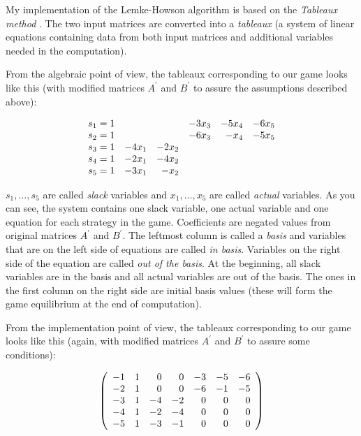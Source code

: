 \documentclass[a4paper,10pt]{article}
\begin{document}
My implementation of the Lemke-Howson algorithm is based on the \emph{Tableaux
method} \cite{Pritchard08}. The two input matrices are converted into a
\emph{tableaux} (a system of linear equations containing data from both
input matrices and additional variables needed in the computation).

From the algebraic point of view, the tableaux corresponding to our game
looks like this (with modified matrices $A^{'}$ and $B^{'}$ to assure the
assumptions described above):

$$\begin{array}{r r r r r r r r}
s_{1} = 1 &         &         & -3x_{3} & -5x_{4} & -6x_{5} \\
s_{2} = 1 &         &         & -6x_{3} & -x_{4}  & -5x_{5} \\
s_{3} = 1 & -4x_{1} & -2x_{2} &         &         &         \\
s_{4} = 1 & -2x_{1} & -4x_{2} &         &         &         \\
s_{5} = 1 & -3x_{1} & -x_{2}  &         &         &
\end{array}$$

$s_{1}, \dots, s_{5}$ are called \emph{slack} variables and $x_{1}, \dots,
x_{5}$ are called \emph{actual} variables. As you can see, the system contains
one slack variable, one actual variable and one equation for each strategy in
the game. Coefficients are negated values from original matrices $A^{'}$ and
$B^{'}$. The leftmost column is called a \emph{basis} and variables that are on
the left side of equations are called \emph{in basis}. Variables on the right
side of the equation are called \emph{out of the basis}. At the beginning, all
slack variables are in the basis and all actual variables are out of the basis.
The ones in the first column on the right side are initial basis values (these
will form the game equilibrium at the end of computation).

From the implementation point of view, the tableaux corresponding to our game
looks like this (again, with modified matrices $A^{'}$ and $B^{'}$ to assure
some conditions):

$$\left(\begin{array}{r r r r r r r}
-1 & 1 & 0 & 0 & -3 & -5 & -6 \\
-2 & 1 & 0 & 0 & -6 & -1 & -5 \\
-3 & 1 & -4 & -2 & 0 & 0 & 0 \\
-4 & 1 & -2 & -4 & 0 & 0 & 0 \\
-5 & 1 & -3 & -1 & 0 & 0 & 0
\end{array}\right)$$
\end{document}
